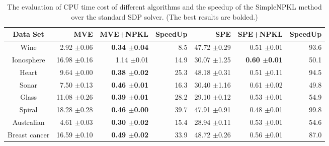 \begin{table}[!hptb]
\centering
\begin{center}
\begin{small}
\begin{tabular}{c | r r r| r r r }
\hline
Data Set &MVE &MVE+NPKL &\!\!SpeedUp &SPE &SPE+NPKL &\!\!SpeedUp\\

\hline
Wine &2.92 $\pm$0.06 &{\bf 0.34 $\pm$0.04} &8.5   &47.72 $\pm$0.29 &0.51 $\pm$0.01 &93.6\\

Ionosphere &16.98 $\pm$0.16  &1.14 $\pm$0.01 &14.9  &30.07 $\pm$1.25  &{\bf 0.60 $\pm$0.01} &50.1\\

Heart &9.64 $\pm$0.00 &{\bf 0.38 $\pm$0.02}   &25.3 &48.18 $\pm$0.31  &0.51 $\pm$0.11 &94.5\\

Sonar   &7.50 $\pm$0.13   &{\bf 0.46 $\pm$0.01}   &16.3   &30.40 $\pm$1.16 &0.61 $\pm$0.02 &49.8 \\

Glass &11.08 $\pm$0.26    &{\bf 0.39 $\pm$0.01}    &28.2  &29.10 $\pm$0.12   &0.53 $\pm$0.01   &54.9\\

Spiral &18.28 $\pm$0.28 &{\bf 0.46 $\pm$0.00} &39.7 &47.91 $\pm$0.91 &0.48 $\pm$0.01  &99.8\\

Australian &4.61 $\pm$0.03   &{\bf 0.30 $\pm$0.02} &15.4 &28.94 $\pm$0.11 &0.53 $\pm$0.01 &54.6\\

\!\!\!Breast cancer\!\! &16.59 $\pm$0.10 &{\bf 0.49 $\pm$0.02} &33.9 &48.72 $\pm$0.26 &0.56 $\pm$0.01 &87.0\\

\hline
\end{tabular}
\end{small}
\end{center}%
\caption{The evaluation of CPU time cost of different algorithms and the speedup of the SimpleNPKL method over the standard SDP solver. (The best results are bolded.)}
\label{table:knn-embedding-time}
\end{table}

